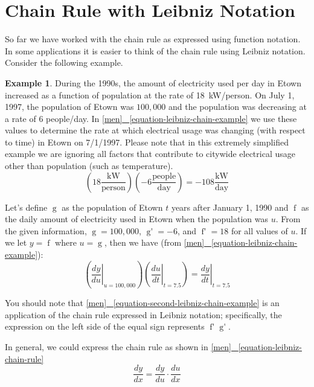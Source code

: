 \documentclass[12pt,]{book}
\theoremstyle{plain}
\theoremstyle{definition}
\newtheorem{example}[theorem]{Example}
\numberwithin{equation}{section}
\newcommand{\fe}[2]{\mathop{{#1}{\left(#2\right)}}}
\newcommand{\fd}[1]{#1'}
\newcommand{\lz}[2]{\frac{d#1}{d#2}}
\newcommand{\lzoa}[3]{\left.{\frac{d#1}{d#2}}\right|_{#3}}
\begin{document}
\section[Chain Rule with Leibniz Notation]{Chain Rule with Leibniz Notation}\label{section-chain-rule-and-leibniz}
So far we have worked with the chain rule as expressed using function notation.  In some applications it is easier to think of the chain rule using Leibniz notation. Consider the following example.%
\begin{example}\label{example-17}
During the 1990s, the amount of electricity used per day in Etown increased as a function of population at the rate of \SI{18}{\kilo\watt}/person.  On July 1, 1997, the population of Etown was \(100{,}000\) and the population was decreasing at a rate of 6 people/day.  In \hyperref[equation-leibniz-chain-example]{[men]
~\ref*{equation-leibniz-chain-example}} we use these values to determine the rate at which electrical usage was changing (with respect to time) in Etown on 7/1/1997.  Please note that in this extremely simplified example we are ignoring all factors that contribute to citywide electrical usage other than population (such as temperature).%
\begin{equation}\left(18\frac{\text{kW}}{\text{person}}\right)\left(-6\frac{\text{people}}{\text{day}}\right)=-108\frac{\text{kW}}{\text{day}}\label{equation-leibniz-chain-example}\end{equation}\par
Let's define \(\fe{g}{t}\)  as the population of Etown \(t\) years after January 1, 1990 and \(\fe{f}{u}\) as the daily amount of electricity used in Etown when the population was \(u\).  From the given information, \(\fe{g}{7.5}=100{,}000\), \(\fe{\fd{g}}{7.5}=-6\), and \(\fe{\fd{f}}{u}=18\) for all values of \(u\).  If we let \(y=\fe{f}{u}\) where \(u=\fe{g}{t}\), then we have (from \hyperref[equation-leibniz-chain-example]{[men]
~\ref*{equation-leibniz-chain-example}}):%
\begin{equation}\left(\lzoa{y}{u}{u=100{,}000}\right)\left(\lzoa{u}{t}{t=7.5}\right)=\lzoa{y}{t}{t=7.5}\label{equation-second-leibniz-chain-example}\end{equation}\par
You should note that \hyperref[equation-second-leibniz-chain-example]{[men]
~\ref*{equation-second-leibniz-chain-example}} is an application of the chain rule expressed in Leibniz notation; specifically, the expression on the left side of the equal sign represents \(\fe{\fd{f}}{\fe{g}{7.5}}\fe{\fd{g}}{7.5}\).%
\end{example}
\par
In general, we could express the chain rule as shown in \hyperref[equation-leibniz-chain-rule]{[men]
~\ref*{equation-leibniz-chain-rule}}%
\begin{equation}\lz{y}{x}=\lz{y}{u}\cdot\lz{u}{x}\label{equation-leibniz-chain-rule}\end{equation}\typeout{************************************************}
\typeout{************************************************}
\end{document}
